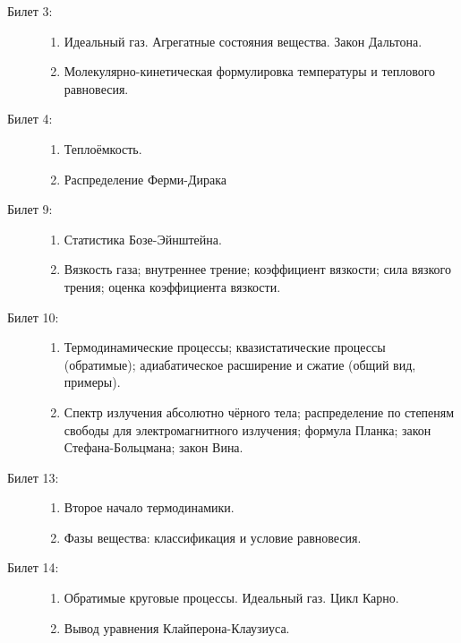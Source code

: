 \documentclass{article}
\makeatletter
\renewcommand{\subsection}{\@startsection{subsection}{2}{0pt}{1em}{1em}{\Large\bf}}
\makeatother
\begin{document}
\subsection{Физика}
\begin{description}
	\item[Билет 3:]\phantom{}
	\begin{enumerate}
		\item Идеальный газ. Агрегатные состояния вещества.
		Закон Дальтона.
		\item Молекулярно-кинетическая формулировка температуры
		и теплового равновесия.
	\end{enumerate}
	\item[Билет 4:]\phantom{}
	\begin{enumerate}
		\item Теплоёмкость.
		\item Распределение Ферми-Дирака
	\end{enumerate}
	\item[Билет 9:]\phantom{}
	\begin{enumerate}
		\item Статистика Бозе-Эйнштейна.
		\item Вязкость газа; внутреннее трение; коэффициент вязкости;
		сила вязкого трения; оценка коэффициента вязкости.
	\end{enumerate}
	\item[Билет 10:]\phantom{}
	\begin{enumerate}
		\item Термодинамические процессы; квазистатические процессы
		(обратимые); адиабатическое расширение и сжатие
		(общий вид, примеры).
		\item Спектр излучения абсолютно чёрного тела; распределение
		по степеням свободы для электромагнитного излучения;
		формула Планка; закон Стефана-Больцмана; закон Вина.
	\end{enumerate}
	\item[Билет 13:]\phantom{}
	\begin{enumerate}
		\item Второе начало термодинамики.
		\item Фазы вещества: классификация и условие равновесия.
	\end{enumerate}
	\item[Билет 14:]\phantom{}
	\begin{enumerate}
		\item Обратимые круговые процессы. Идеальный газ. Цикл Карно.
		\item Вывод уравнения Клайперона-Клаузиуса.

\end{enumerate}
\end{description}
\end{document}
